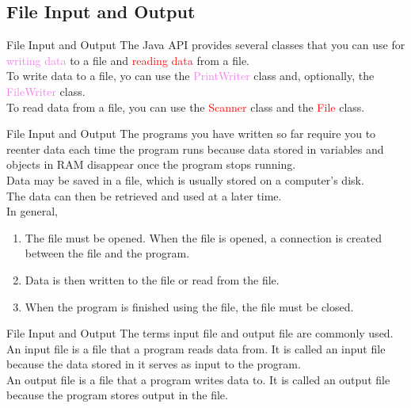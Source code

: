 \documentclass[11pt]{beamer}
\newcommand{\red}[1]{\textcolor{red}{#1}}
\newcommand{\violet}[1]{\textcolor{violet}{#1}}
\begin{document}
\subsection{File Input and Output}
\begin{frame}{File Input and Output}
    The Java API provides several classes that you can use for \violet{writing data} to a file and \red{reading data} from a file. \\
    \vspace{1em}
    To write data to a file, yo can use the \violet{PrintWriter} class and, optionally, the \violet{FileWriter} class. \\
    \vspace{1em} 
    To read data from a file, you can use the \red{Scanner} class and the \red{File} class.
\end{frame}

\begin{frame}{File Input and Output}
    The programs you have written so far require you to reenter data each time the program runs because data stored in variables and objects in RAM disappear once the program stops running. \\
    \vspace{1em}
    Data may be saved in a file, which is usually stored on a computer’s disk. \\
    \vspace{1em}
    The data can then be retrieved and used at a later time. \\
    \vspace{1em} 
    In general,
    \begin{enumerate}
        \item The file must be opened. When the file is opened, a connection is created between the file and the program.
        \item Data is then written to the file or read from the file. 
        \item When the program is finished using the file, the file must be closed.
    \end{enumerate}
\end{frame}

\begin{frame}{File Input and Output}
    The terms input file and output file are commonly used. \\
    \vspace{1em} 
    An input file is a file that a program reads data from. It is called an input file because the data stored in it serves as input to the program. \\ 
    \vspace{1em} 
    An output file is a file that a program writes data to. It is called an output file because the program stores output in the file. \\ 
    \vspace{1em}
\end{frame}
\end{document}
